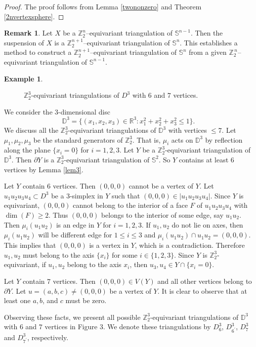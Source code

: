 \documentclass[11pt]{amsart}
\numberwithin{equation}{section}
\theoremstyle{definition}
\newtheorem{example}[theorem]{Example}
\newtheorem{remark}[theorem]{Remark}
\newcommand{\Sp}{\mathbb{S}}
\def \bb{\mathbb}
\def \RR{{\bb{R}}}
\def \ZZ{{\bb{Z}}}
\begin{document}
\begin{proof}
The proof follows from Lemma \ref{twononzero} and Theorem \ref{2nvertexsphere}.
\end{proof}


\begin{remark}
    Let $X$ be a $\mathbb{Z}_2^n$–equivariant triangulation of $\mathbb{S}^{n-1}$. Then the suspension of $X$ is a $\mathbb{Z}_2^{n+1}$–equivariant triangulation of $\mathbb{S}^{n}$. This  establishes a method to construct a $\mathbb{Z}_2^{n+1}$–equivariant triangulation of $\mathbb{S}^n$ from a given $\mathbb{Z}_2^{\,n}$–equivariant triangulation of $\mathbb{S}^{n-1}$.
\end{remark}


\begin{example}\label{trid3}
\begin{figure}[ht]
\centerline{
\scalebox{.80}{

 }
 }
\caption {$\ZZ_2^3$-equivariant triangulations of $D^3$ with $6$ and $7$ vertices.}
\label{egch201a}
\end{figure}
We consider the $3$-dimensional disc $$\mathbb{D}^3=\{(x_1, x_2, x_3) \in \RR^3 : x_1^2 + x_2^2+x_3^2 \leq 1\}.$$ 
We discuss all the $\mathbb{Z}_2^3$-equivariant triangulations of $\mathbb{D}^3$ with vertices $\leq 7$. Let $\mu_1, \mu_2, \mu_3$ be the standard generators of $\mathbb{Z}_2^3$. That is, $\mu_i$ acts on $\mathbb{D}^3$ by reflection along the plane $\{x_i = 0\}$ for $i = 1, 2, 3$. Let $Y$ be a $\mathbb{Z}_2^3$-equivariant triangulation of $\mathbb{D}^3$.  
Then $\partial Y$ is a $\mathbb{Z}_2^3$-equivariant triangulation of $\Sp^2$.  
So $Y$ contains at least $6$ vertices by Lemma \ref{lem3}. 

Let $Y$ contain $6$ vertices.  
Then $(0,0,0)$ cannot be a vertex of $Y$.  
Let $u_1u_2u_3u_4 \subset D^3$ be a $3$-simplex in $Y$ such that $(0,0,0) \in |u_1u_2u_3u_4|$.  
Since $Y$ is equivariant, $(0,0,0)$ cannot belong to the interior of a face $F$ of $u_1u_2u_3u_4$ with $\dim(F) \geq 2$.  Thus $(0,0,0)$ belongs to the interior of some edge, say $u_1u_2$. Then $\mu_i(u_1u_2)$ is an edge in $Y$ for $i = 1, 2, 3$. If $u_1,u_2$ do not lie on axes, then $\mu_i(u_1u_2)$ will be different edge for $1\leq i\leq 3$ and  $\mu_i(u_1u_2)\cap u_1u_2=(0,0,0)$. This implies that $(0,0,0)$ is a vertex in $Y$, which is a contradiction.
Therefore $u_1, u_2$ must belong to the axis $\{x_i\}$ for some $i \in \{1,2,3\}$.  Since $Y$ is $\mathbb{Z}_2^3$-equivariant, if $u_1, u_2$ belong to the axis $x_i$, then $u_3, u_4 \in Y \cap \{x_i = 0\}$.  

Let $Y$ contain $7$ vertices.  
Then $(0,0,0) \in V(Y)$ and all other vertices belong to $\partial Y$.  
Let $u = (a,b,c) \neq (0,0,0)$ be a vertex of $Y$.  It is clear to observe that at least one $a,b$, and $c$ must be zero.
 

Observing these facts, we present all possible $\mathbb{Z}_2^3$-equivariant triangulations of $\mathbb{D}^3$ with $6$ and $7$ vertices in Figure $3$.  
We denote these triangulations by $D^3_6$, $D^{3}_{6^{\prime}}$, $D^3_7$ and $D^{3}_{7^{\prime}}$, respectively.  

\end{example}
\end{document}
